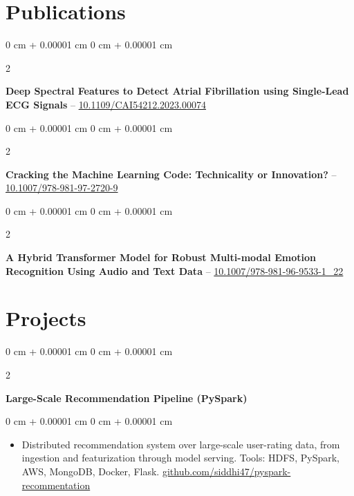 \documentclass[10pt, letterpaper]{article}
\newenvironment{highlights}{
    \begin{itemize}[
        topsep=0.04 cm,
        parsep=0.04 cm,
        partopsep=0pt,
        itemsep=0pt,
        leftmargin=0 cm + 10pt
    ]
}{
    \end{itemize}
} %
\newenvironment{onecolentry}{
    \begin{adjustwidth}{
        0 cm + 0.00001 cm
    }{
        0 cm + 0.00001 cm
    }
}{
    \end{adjustwidth}
} %
\newenvironment{twocolentry}[2][]{
    \onecolentry
    \def\secondColumn{#2}
    \setcolumnwidth{\fill, 4.5 cm}
    \begin{paracol}{2}
}{
    \switchcolumn \raggedleft \secondColumn
    \end{paracol}
    \endonecolentry
} %
\begin{document}
    
    \section{Publications}
        
        \begin{samepage}
            \begin{twocolentry}{
                2023
            }
                \textbf{Deep Spectral Features to Detect Atrial Fibrillation using Single-Lead ECG Signals} -- \href{https://ieeexplore.ieee.org/document/10195073}{10.1109/CAI54212.2023.00074}
            \end{twocolentry}
        \end{samepage}

\vspace{0.06 cm}

     \begin{samepage}
            \begin{twocolentry}{
                2024
            }
                \textbf{Cracking the Machine Learning Code: Technicality or Innovation?} -- \href{https://doi.org/10.1007/978-981-97-2720-9}{10.1007/978-981-97-2720-9}
            \end{twocolentry}
        \end{samepage}
\vspace{0.06 cm}

    \begin{samepage}
            \begin{twocolentry}{
                2025
            }
                \textbf{A Hybrid Transformer Model for Robust Multi-modal Emotion Recognition Using Audio and Text Data} -- \href{https://link.springer.com/chapter/10.1007/978-981-96-9533-1_22}{10.1007/978-981-96-9533-1\_22}
            \end{twocolentry}
        \end{samepage}
    
    \section{Projects}

        \begin{twocolentry}{
        }
            \textbf{Large-Scale Recommendation Pipeline (PySpark)}\end{twocolentry}

        \vspace{0.06 cm}
        \begin{onecolentry}
            \begin{highlights}
                \item Distributed recommendation system over large-scale user-rating data, from ingestion and featurization through model serving. Tools: HDFS, PySpark, AWS, MongoDB, Docker, Flask. \href{https://github.com/siddhi47/pyspark-recommentation}{github.com/siddhi47/pyspark-recommentation}
            \end{highlights}
        \end{onecolentry}
\end{document}
